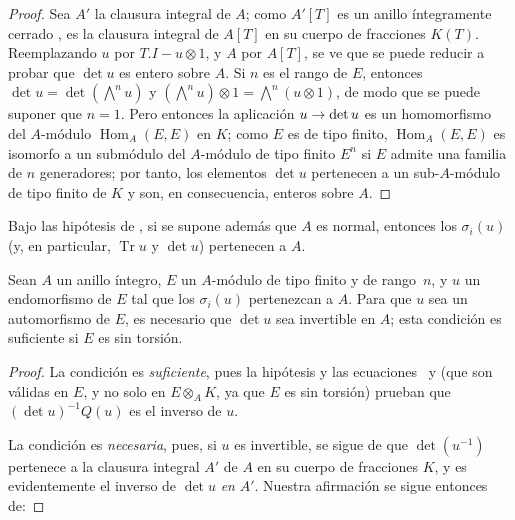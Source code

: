 \documentclass[oneside,10pt]{amsart}
\makeatletter
\newcommand{\ega@arrow}[2]{\mathchoice{#1}{#2}{#2}{#2}}
\renewcommand{\to}{\ega@arrow{\longrightarrow}{\rightarrow}}
\newcommand{\oldpage}[2][]{\marginnote{\normalfont\footnotesize\textbf{#1}~|~#2}\ignorespaces}
\let\EGAOriginalLabel\label
\renewcommand{\label}[1]{\phantomsection\EGAOriginalLabel{#1}}
\makeatother
\begin{document}
\begin{proof}
Sea $A'$ la clausura integral de $A$;
como $A'[T]$ es un anillo íntegramente cerrado \cite[p.~99]{II-24}, es la clausura integral de $A[T]$ en su cuerpo de fracciones $K(T)$.
Reemplazando $u$ por $T.I-u\otimes1$, y $A$ por $A[T]$, se ve que se puede reducir a probar que $\det u$ es entero sobre $A$.
Si $n$ es el rango de $E$, entonces $\det u=\det(\bigwedge^n u)$ y $(\bigwedge^n u)\otimes1=\bigwedge^n(u\otimes1)$, de modo que se puede suponer que $n=1$.
Pero entonces la aplicación $u\to\det u$ es un homomorfismo del $A$-módulo $\operatorname{Hom}_A(E,E)$ en $K$;
como $E$ es de tipo finito, $\operatorname{Hom}_A(E,E)$ es isomorfo a un submódulo del $A$-módulo de tipo finito $E^n$ si $E$ admite una familia de $n$ generadores; por tanto, los elementos $\det u$ pertenecen a un sub-$A$-módulo de tipo finito de $K$ y son, en consecuencia, enteros sobre $A$.
\end{proof}

\oldpage[II]{122}
\begin{corollary}[6.4.4]
\label{II.6.4.4-fr}
Bajo las hipótesis de , si se supone además que $A$ es normal, entonces los $\sigma_i(u)$ (y, en particular, $\operatorname{Tr}u$ y $\det u$) pertenecen a $A$.
\end{corollary}

\begin{proposition}[6.4.5]
\label{II.6.4.5-fr}
Sean $A$ un anillo íntegro, $E$ un $A$-módulo de tipo finito y de rango~$n$, y $u$ un endomorfismo de $E$ tal que los $\sigma_i(u)$ pertenezcan a $A$.
Para que $u$ sea un automorfismo de $E$, es necesario que $\det u$ sea invertible en $A$;
esta condición es suficiente si $E$ es sin torsión.
\end{proposition}

\begin{proof}
La condición es \emph{suficiente}, pues la hipótesis y las ecuaciones~ y  (que son válidas en $E$, y no solo en $E\otimes_AK$, ya que $E$ es sin torsión) prueban que $(\det u)^{-1}Q(u)$ es el inverso de $u$.

La condición es \emph{necesaria}, pues, si $u$ es invertible, se sigue de  que $\det(u^{-1})$ pertenece a la clausura integral $A'$ de $A$ en su cuerpo de fracciones $K$, y es evidentemente el inverso de $\det u$ \emph{en} $A'$.
Nuestra afirmación se sigue entonces de:
\end{proof}
\end{document}
